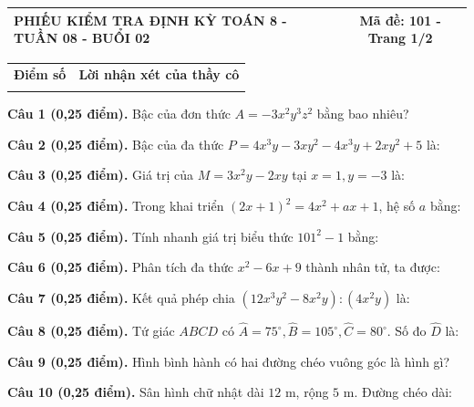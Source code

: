 \documentclass[12pt,a4paper]{article}
\begin{document}
\pagestyle{empty}
\noindent
\begin{tabularx}{\linewidth}{|X|c|}
\hline
\textbf{PHIẾU KIỂM TRA ĐỊNH KỲ TOÁN 8 - TUẦN 08 - BUỔI 02} & \textbf{Mã đề: 101 - Trang 1/2} \\
\hline
\end{tabularx}

\vspace{1.2mm}

\noindent
\begin{tabularx}{\linewidth}{|p{3.2cm}|X|}
\hline
\centering\textbf{Điểm số} & \centering\textbf{Lời nhận xét của thầy cô} \tabularnewline
\rule{0pt}{1.8cm} & \\
\hline
\end{tabularx}

\vspace{1.2mm}

\noindent\textbf{Câu 1 (0,25 điểm).} Bậc của đơn thức $A = -3x^2 y^3 z^2$ bằng bao nhiêu? \par\vspace{0.3mm}
\noindent\textbf{Câu 2 (0,25 điểm).} Bậc của đa thức $P = 4x^3 y - 3xy^2 - 4x^3 y + 2xy^2 + 5$ là: \par\vspace{0.3mm}
\noindent\textbf{Câu 3 (0,25 điểm).} Giá trị của $M = 3x^2 y - 2xy$ tại $x = 1, y = -3$ là: \par\vspace{0.3mm}
\noindent\textbf{Câu 4 (0,25 điểm).} Trong khai triển $(2x + 1)^2 = 4x^2 + ax + 1$, hệ số $a$ bằng: \par\vspace{0.3mm}
\noindent\textbf{Câu 5 (0,25 điểm).} Tính nhanh giá trị biểu thức $101^2 - 1$ bằng: \par\vspace{0.3mm}
\noindent\textbf{Câu 6 (0,25 điểm).} Phân tích đa thức $x^2 - 6x + 9$ thành nhân tử, ta được: \par\vspace{0.3mm}
\noindent\textbf{Câu 7 (0,25 điểm).} Kết quả phép chia $(12x^3 y^2 - 8x^2 y) : (4x^2 y)$ là: \par\vspace{0.3mm}
\noindent\textbf{Câu 8 (0,25 điểm).} Tứ giác $ABCD$ có $\widehat{A}=75^\circ, \widehat{B}=105^\circ, \widehat{C}=80^\circ$. Số đo $\widehat{D}$ là: \par\vspace{0.3mm}
\noindent\textbf{Câu 9 (0,25 điểm).} Hình bình hành có hai đường chéo vuông góc là hình gì? \par\vspace{0.3mm}
\noindent\textbf{Câu 10 (0,25 điểm).} Sân hình chữ nhật dài $12\text{ m}$, rộng $5\text{ m}$. Đường chéo dài: \par\vspace{0.3mm}
\end{document}
